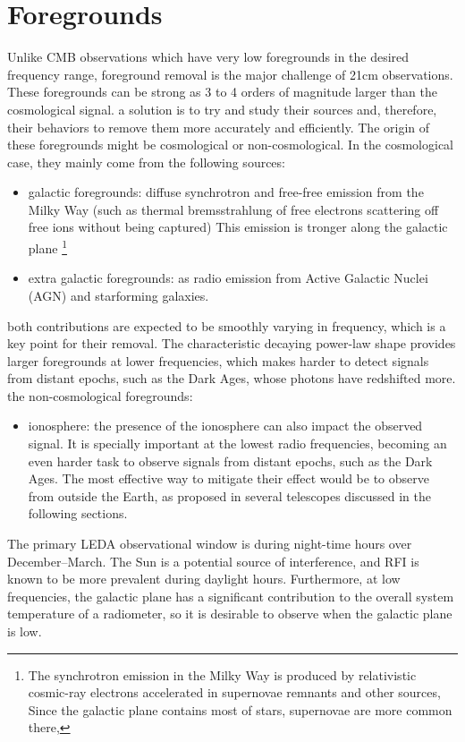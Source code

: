 \documentclass[12pt, TexShade, letterpaper]{report}
\begin{document}
\section{Foregrounds}
Unlike CMB observations which have very low foregrounds in the desired frequency range, foreground removal is the major challenge of 21cm observations. These foregrounds can be strong as 3 to 4 orders of magnitude larger than the cosmological signal. a solution is to try and study their sources and, therefore, their behaviors to remove them more accurately and efficiently. The origin of these foregrounds might be cosmological or non-cosmological. In the cosmological case, they mainly come from the following sources:\par
\begin{itemize}
    \item galactic foregrounds: diffuse synchrotron and free-free emission from the Milky Way (such as thermal bremsstrahlung of free electrons scattering off free ions without being captured)
    This emission is tronger along the galactic plane \footnote{The synchrotron emission in the Milky Way is produced by relativistic cosmic-ray electrons accelerated in supernovae remnants and other sources, Since the galactic plane contains most of stars, supernovae are more common there,}
    
    \item extra galactic foregrounds: as radio emission from Active Galactic Nuclei (AGN) and starforming galaxies.
\end{itemize}
both contributions are expected to be smoothly varying in frequency, which is a key point for their removal. The characteristic decaying power-law shape provides larger foregrounds at lower frequencies, which makes harder to detect signals from distant epochs, such as the Dark Ages, whose photons have redshifted more.
the non-cosmological foregrounds:
\begin{itemize}
    \item ionosphere: the presence of the ionosphere can also impact the observed signal. It is specially important at the lowest radio frequencies, becoming an even harder task to observe signals from distant epochs, such as the Dark Ages. The most effective way to mitigate their effect would be to observe from outside the Earth, as proposed in several telescopes discussed in the following sections.
\end{itemize}
The primary LEDA observational window is during night-time hours over December–March. The Sun is a potential source of interference, and RFI is known to be more prevalent during daylight hours. Furthermore, at low frequencies, the galactic plane has a significant contribution to the overall system temperature of a radiometer, so it is desirable to observe when the galactic plane is low. 
\cite{leda_design}
\end{document}
